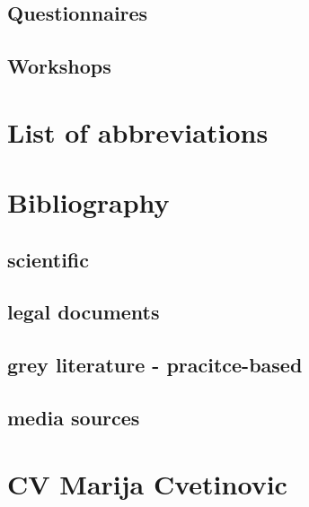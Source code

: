 \documentclass[11pt]{report}
\begin{document}
\section{Questionnaires}
\section{Workshops}

\newpage
\chapter{List of abbreviations}

\newpage
\chapter{Bibliography}
\section{scientific}
\section{legal documents}
\section{grey literature - pracitce-based}
\section{media sources}

\newpage
\chapter{CV Marija Cvetinovic}



\begin{small}

\end{small}



\newpage
\appendix
\noappendicestocpagenum
\addappheadtotoc
\end{document}
